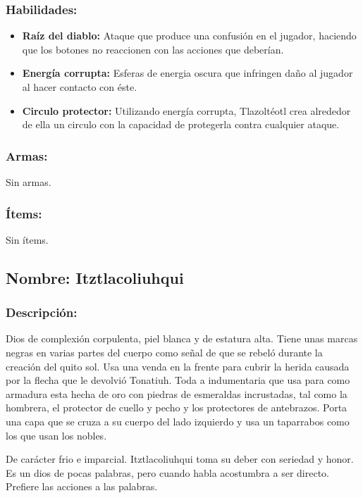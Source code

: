 \documentclass[11pt,letterpaper]{article}
\begin{document}
\subsubsection{Habilidades:}
\begin{itemize}
	\item \textbf{Raíz del diablo:} Ataque que produce una confusión en el jugador, haciendo que los botones no reaccionen con las acciones que deberían.
	\item \textbf{Energía corrupta:} Esferas de energia oscura que infringen daño al jugador al hacer contacto con éste.
	\item \textbf{Circulo protector:} Utilizando energía corrupta,  Tlazoltéotl crea alrededor de ella un circulo con la capacidad de protegerla contra cualquier ataque.
\end{itemize} 
\subsubsection{Armas:}
Sin armas.
\subsubsection{Ítems:}
Sin ítems.



\subsection{Nombre: Itztlacoliuhqui}  \label{per.itztlacoliuhqui}

\subsubsection{Descripción:}
Dios de complexión corpulenta, piel blanca y de estatura alta. Tiene unas marcas negras en varias partes del cuerpo como señal de que se rebeló durante la creación del quito sol. Usa una venda en la frente para cubrir la herida causada por la flecha que le devolvió Tonatiuh. Toda a indumentaria que usa para como armadura esta hecha de oro con piedras de esmeraldas incrustadas, tal como la hombrera, el protector de cuello y pecho y los protectores de antebrazos. Porta una capa que se cruza a su cuerpo del lado izquierdo y usa un taparrabos como los que usan los nobles.
\\
\par
De carácter frio e imparcial. Itztlacoliuhqui toma su deber con seriedad y honor. Es un dios de pocas palabras, pero cuando habla acostumbra a ser directo. Prefiere las acciones a las palabras. 
\end{document}
